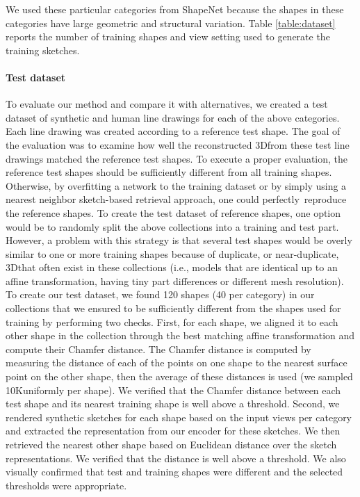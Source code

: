 \documentclass[10pt, conference, compsocconf]{IEEEtran}
\begin{document}
We used these   particular categories from ShapeNet because the shapes in these categories have large geometric and structural variation. 
Table \ref{table:dataset} reports the number of training shapes and   view setting  used to generate the  training sketches.
\vspace{-1mm}\paragraph{Test dataset} To evaluate our method and compare it with alternatives, we created a test dataset of synthetic and human line drawings for each of the above categories. Each  line drawing was created according to  a reference test shape. The goal of the evaluation was to examine how well the reconstructed 3D\shapes  from these test line drawings matched the  reference test shapes.
To execute a proper evaluation, the reference test shapes should be sufficiently different from all training shapes. Otherwise, by overfitting a network to the training dataset or by simply using a nearest neighbor sketch-based retrieval approach, one could perfectly\  reproduce the reference shapes. To create the test dataset of reference shapes,
one option would be to randomly split the above collections
into a training and test part.
However, a problem with this strategy is that several test shapes would be overly similar to one or more training shapes because of  duplicate, or near-duplicate, 3D\models that often exist in these collections (i.e., models that are identical up to an affine transformation, having tiny part differences or  different mesh resolution). To create our test dataset,
we found 120  shapes (40 per category) in our collections
that we ensured to be sufficiently different from the  shapes used for training by performing two  checks. First, for each shape, we  aligned it to each other shape in the collection through the best matching affine transformation and compute their Chamfer distance. The Chamfer distance
is computed by measuring the distance of each of the points on one shape  to the nearest surface point on the other shape, then the average of  these distances is used (we sampled 10K\points uniformly per shape). We verified that the Chamfer distance between each test  shape and its nearest training shape is well above a threshold. Second, we rendered synthetic sketches for each  shape based on the input views  per category and extracted the representation from our encoder for these sketches. We then retrieved the   nearest other shape based on Euclidean distance over  the sketch representations. We verified that the distance is well above a threshold. We also visually confirmed that  test
and  training shapes
were different and the selected thresholds were appropriate.
\end{document}
